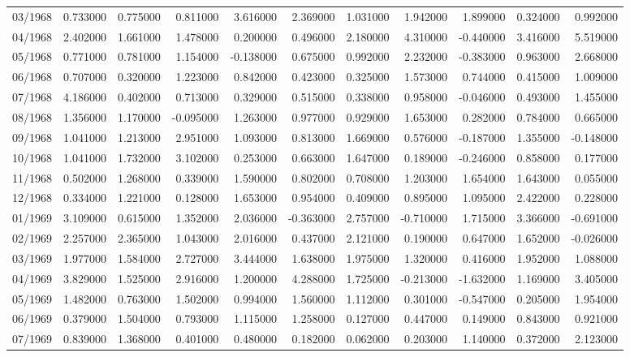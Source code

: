 \begin{tabular}{lrrrrrrrrrr}
03/1968 & 0.733000 & 0.775000 & 0.811000 & 3.616000 & 2.369000 & 1.031000 & 1.942000 & 1.899000 & 0.324000 & 0.992000 \\
04/1968 & 2.402000 & 1.661000 & 1.478000 & 0.200000 & 0.496000 & 2.180000 & 4.310000 & -0.440000 & 3.416000 & 5.519000 \\
05/1968 & 0.771000 & 0.781000 & 1.154000 & -0.138000 & 0.675000 & 0.992000 & 2.232000 & -0.383000 & 0.963000 & 2.668000 \\
06/1968 & 0.707000 & 0.320000 & 1.223000 & 0.842000 & 0.423000 & 0.325000 & 1.573000 & 0.744000 & 0.415000 & 1.009000 \\
07/1968 & 4.186000 & 0.402000 & 0.713000 & 0.329000 & 0.515000 & 0.338000 & 0.958000 & -0.046000 & 0.493000 & 1.455000 \\
08/1968 & 1.356000 & 1.170000 & -0.095000 & 1.263000 & 0.977000 & 0.929000 & 1.653000 & 0.282000 & 0.784000 & 0.665000 \\
09/1968 & 1.041000 & 1.213000 & 2.951000 & 1.093000 & 0.813000 & 1.669000 & 0.576000 & -0.187000 & 1.355000 & -0.148000 \\
10/1968 & 1.041000 & 1.732000 & 3.102000 & 0.253000 & 0.663000 & 1.647000 & 0.189000 & -0.246000 & 0.858000 & 0.177000 \\
11/1968 & 0.502000 & 1.268000 & 0.339000 & 1.590000 & 0.802000 & 0.708000 & 1.203000 & 1.654000 & 1.643000 & 0.055000 \\
12/1968 & 0.334000 & 1.221000 & 0.128000 & 1.653000 & 0.954000 & 0.409000 & 0.895000 & 1.095000 & 2.422000 & 0.228000 \\
01/1969 & 3.109000 & 0.615000 & 1.352000 & 2.036000 & -0.363000 & 2.757000 & -0.710000 & 1.715000 & 3.366000 & -0.691000 \\
02/1969 & 2.257000 & 2.365000 & 1.043000 & 2.016000 & 0.437000 & 2.121000 & 0.190000 & 0.647000 & 1.652000 & -0.026000 \\
03/1969 & 1.977000 & 1.584000 & 2.727000 & 3.444000 & 1.638000 & 1.975000 & 1.320000 & 0.416000 & 1.952000 & 1.088000 \\
04/1969 & 3.829000 & 1.525000 & 2.916000 & 1.200000 & 4.288000 & 1.725000 & -0.213000 & -1.632000 & 1.169000 & 3.405000 \\
05/1969 & 1.482000 & 0.763000 & 1.502000 & 0.994000 & 1.560000 & 1.112000 & 0.301000 & -0.547000 & 0.205000 & 1.954000 \\
06/1969 & 0.379000 & 1.504000 & 0.793000 & 1.115000 & 1.258000 & 0.127000 & 0.447000 & 0.149000 & 0.843000 & 0.921000 \\
07/1969 & 0.839000 & 1.368000 & 0.401000 & 0.480000 & 0.182000 & 0.062000 & 0.203000 & 1.140000 & 0.372000 & 2.123000 \\

\end{tabular}
